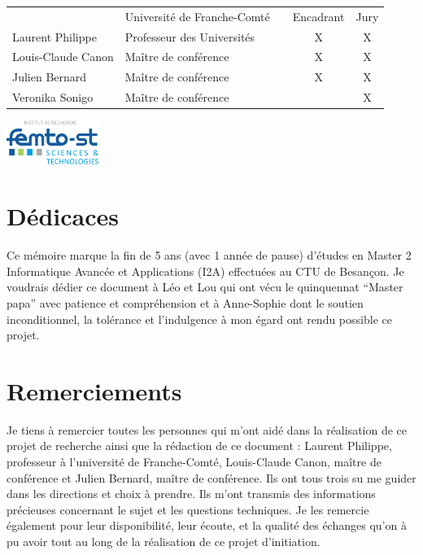 \documentclass[a4paper,12pt]{report}
\theoremstyle{plain}				%
\theoremstyle{definition}				%
\begin{document}
\begin{titlepage}
\begin{center}
\vspace{.05\textheight}
\vspace{.05\textheight}
\vspace{.05\textheight}
\vspace{.05\textheight}
\begin{tabular}{lllcc}
					&Université de Franche-Comté	&	& Encadrant &	Jury 	\\
Laurent Philippe 	& Professeur des Universités 	& 	&  	X		&	X		\\
Louis-Claude Canon 	& Maître de conférence 			& 	&  	X		&	X		\\
Julien Bernard 		& Maître de conférence 			& 	&  	X		&	X		\\
Veronika Sonigo		& Maître de conférence 			&	&			&	X		\\
\end{tabular}
  
\end{center}
\bigskip
\includegraphics[width=3cm]{logoFEMTO_ST.png}
\end{titlepage}








\section*{Dédicaces} \label{sec:dedicace}
Ce mémoire marque la fin de 5 ans (avec 1 année de pause) d'études en Master 2  
Informatique Avancée et Applications (I2A) effectuées au CTU de Besançon. 
Je voudrais dédier ce document à Léo et Lou qui ont vécu le quinquennat ``Master papa'' avec 
patience et compréhension et 
à Anne-Sophie dont le soutien inconditionnel, la tolérance et l'indulgence 
à mon égard ont rendu possible ce projet. 


\section*{Remerciements} \label{sec:remerciements}
Je tiens à remercier toutes les personnes qui m'ont aidé dans la réalisation de ce projet de recherche ainsi que la rédaction de ce document :
Laurent Philippe, professeur à l'université de Franche-Comté,
Louis-Claude Canon, maître de conférence et 
Julien Bernard, maître de conférence.
Ils ont tous trois su me guider dans les directions et choix à prendre. 
Ils m'ont transmis des informations précieuses concernant le sujet et les questions techniques.
Je les remercie également pour leur disponibilité, leur écoute, et la qualité des échanges qu'on à pu avoir tout au long de la réalisation de ce projet d'initiation.
\end{document}
